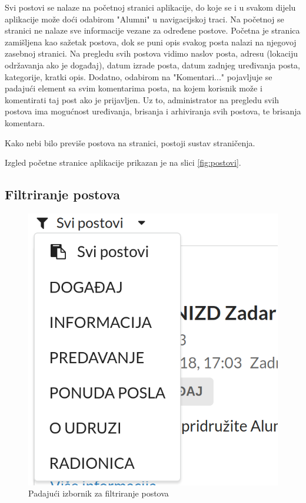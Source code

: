 \documentclass[zavrsni, numeric]{fer}
\begin{document}
Svi postovi se nalaze na početnoj stranici aplikacije, do koje se i u svakom dijelu aplikacije može doći odabirom "Alumni" u navigacijskoj traci. Na početnoj se stranici ne nalaze sve informacije vezane za određene postove. Početna je stranica zamišljena kao sažetak postova, dok se puni opis svakog posta nalazi na njegovoj zasebnoj stranici. Na pregledu svih postova vidimo naslov posta, adresu (lokaciju održavanja ako je događaj), datum izrade posta, datum zadnjeg uređivanja posta, kategorije, kratki opis. Dodatno, odabirom na "Komentari..." pojavljuje se padajući element sa svim komentarima posta, na kojem korisnik može i komentirati taj post ako je prijavljen. Uz to, administrator na pregledu svih postova ima mogućnost uređivanja, brisanja i arhiviranja svih postova, te brisanja komentara. 

Kako nebi bilo previše postova na stranici, postoji sustav straničenja.

Izgled početne stranice aplikacije prikazan je na slici \ref{fig:postovi}.

\subsection{Filtriranje postova}

\begin{figure}[H]
	\centering
	\includegraphics[width=13cm]{slike/filter.png}
	\caption{Padajući izbornik za filtriranje postova}
	\label{fig:filter}
\end{figure}
\end{document}
